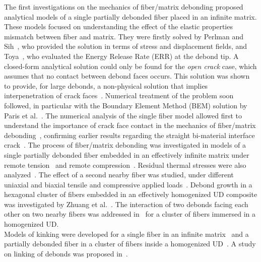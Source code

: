 \documentclass[smallextended]{svjour3}       %
\begin{document}
The first investigations on the mechanics of fiber/matrix debonding proposed analytical models of a single partially debonded fiber placed in an infinite matrix. These models focused on understanding the effect of the elastic properties mismatch between fiber and matrix. They were firstly solved by Perlman and Sih~\cite{Perlman1967}, who provided the solution in terms of stress and displacement fields, and Toya~\cite{Toya1974}, who evaluated the Energy Release Rate (ERR) at the debond tip. A closed-form analytical solution could only be found for the \textit{open crack} case, which assumes that no contact between debond faces occurs. This solution was shown to provide, for large debonds, a non-physical solution that implies interpenetration of crack faces~\cite{Toya1974,Comninou1977}. Numerical treatment of the problem soon followed, in particular with the Boundary Element Method (BEM) solution by Paris et al.~\cite{Paris1996}. The numerical analysis of the single fiber model allowed first to understand the importance of crack face contact in the mechanics of fiber/matrix debonding~\cite{Varna1997a}, confirming earlier results regarding the straight bi-material interface crack~\cite{Comninou1977}. The process of fiber/matrix debonding was investigated in models of a single partially debonded fiber embedded in an effectively infinite matrix under remote tension~\cite{Paris1996} and remote compression~\cite{Correa2007}. Residual thermal stresses were also analyzed~\cite{Correa2011}. The effect of a second nearby fiber was studied, under different uniaxial and biaxial tensile and compressive applied loads~\cite{Correa2013,Correa2014,Sandino2016,Sandino2018}. Debond growth in a hexagonal cluster of fibers embedded in an effectively homogenized UD composite was investigated by Zhuang et al.~\cite{Zhuang2018}. The interaction of two debonds facing each other on two nearby fibers was addressed in~\cite{Varna2017} for a cluster of fibers immersed in a homogenized UD.\\
Models of kinking were developed for a single fiber in an infinite matrix~\cite{Paris2007} and a partially debonded fiber in a cluster of fibers inside a homogenized UD~\cite{Zhuang2018a}. A study on linking of debonds was proposed in~\cite{Varna2017}.\\
\end{document}
